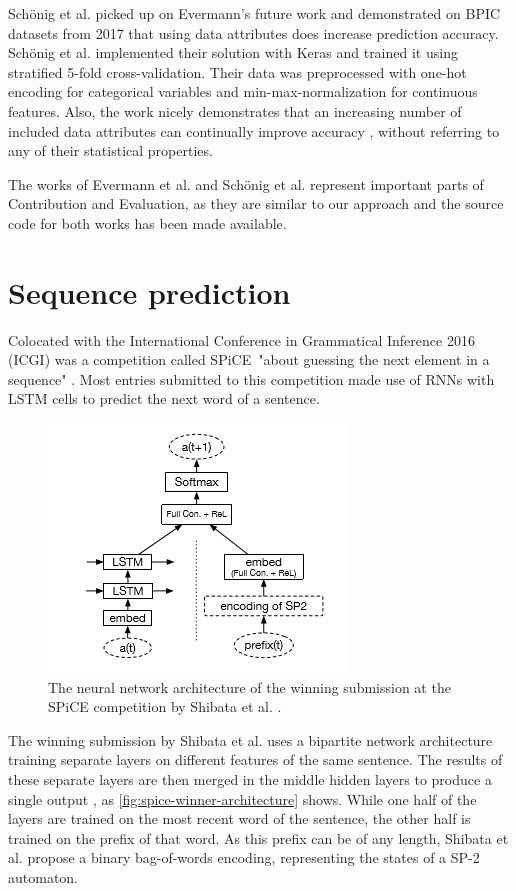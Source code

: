 Schönig et al. \cite{schoenig2018} picked up on Evermann's future work and demonstrated on BPIC datasets from 2017 that using data attributes does increase prediction accuracy. Schönig et al. implemented their solution with Keras and trained it using stratified 5-fold cross-validation. Their data was preprocessed with one-hot encoding for categorical variables and min-max-normalization for continuous features. Also, the work nicely demonstrates that an increasing number of included data attributes can continually improve accuracy \cite[p.5]{schoenig2018}, without referring to any of their statistical properties.

The works of Evermann et al. and Schönig et al. represent important parts of Contribution and Evaluation, as they are similar to our approach and the source code for both works has been made available.\\

\section{Sequence prediction}
\label{sec:related-work-sequence-prediction}
Colocated with the International Conference in Grammatical Inference 2016 (ICGI) was a competition called SPiCE\ "about guessing the next element in a sequence" \cite{web:spice}. Most entries submitted to this competition made use of RNNs with LSTM cells to predict the next word of a sentence.

\begin{figure}
    \centering
    \includegraphics[height=.4\textwidth]{gfx/spice-winner-architecture.png}
    \caption{The neural network architecture of the winning submission at the SPiCE competition by Shibata et al. \cite{shibata2016bipartite}.}
    \label{fig:spice-winner-architecture}
\end{figure}

The winning submission by Shibata et al. uses a bipartite network architecture training separate layers on different features of the same sentence. The results of these separate layers are then merged in the middle hidden layers to produce a single output \cite{shibata2016bipartite}, as \autoref{fig:spice-winner-architecture} shows.
While one half of the layers are trained on the most recent word of the sentence, the other half is trained on the prefix of that word. As this prefix can be of any length, Shibata et al. propose a binary bag-of-words encoding, representing the states of a SP-2 automaton.

